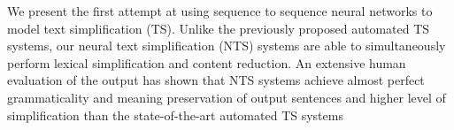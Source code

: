 We present the first attempt at using sequence to sequence neural networks to model text simplification (TS). Unlike the previously proposed automated TS systems, our neural text simplification (NTS) systems are able to simultaneously perform lexical simplification and content reduction. An extensive human evaluation of the output has shown that NTS systems achieve almost perfect                          grammaticality and meaning preservation of output sentences and higher level of simplification than the state-of-the-art automated TS systems
